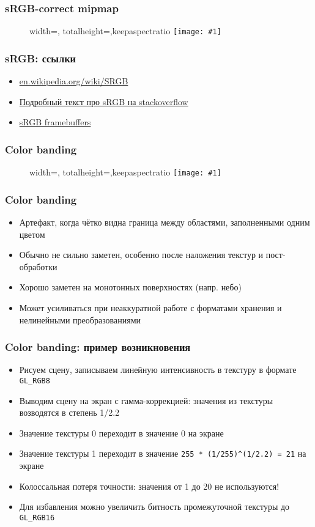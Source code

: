 \documentclass{beamer}
\newcommand{\slideimage}[1]{
  \begin{figure}
    \begin{adjustbox}{width=\textwidth, totalheight=\textheight-2\baselineskip-2\baselineskip,keepaspectratio}
      \texttt{[image: \#1]}
    \end{adjustbox}
  \end{figure}
}
\begin{document}
\begin{frame}[fragile]
\frametitle{sRGB-correct mipmap}
\slideimage{srgb-mipmap.png}
\end{frame}

\begin{frame}[fragile]
\frametitle{sRGB: ссылки}
\begin{itemize}
\item \href{https://en.wikipedia.org/wiki/SRGB}{en.wikipedia.org/wiki/SRGB}
\item \href{https://stackoverflow.com/a/12894053/2315602}{Подробный текст про sRGB на stackoverflow}
\item \href{https://www.khronos.org/opengl/wiki/Framebuffer#Colorspace}{sRGB framebuffers}
\end{itemize}
\end{frame}

\begin{frame}[fragile]
\frametitle{Color banding}
\slideimage{banding.jpg}
\end{frame}

\begin{frame}[fragile]
\frametitle{Color banding}
\begin{itemize}
\item Артефакт, когда чётко видна граница между областями, заполненными одним цветом
\pause
\item Обычно не сильно заметен, особенно после наложения текстур и пост-обработки
\pause
\item Хорошо заметен на монотонных поверхностях (напр. небо)
\pause
\item Может усиливаться при неаккуратной работе с форматами хранения и нелинейными преобразованиями
\end{itemize}
\end{frame}

\begin{frame}[fragile]
\frametitle{Color banding: пример возникновения}
\begin{itemize}
\item Рисуем сцену, записываем линейную интенсивность в текстуру в формате \verb|GL_RGB8|
\pause
\item Выводим сцену на экран с гамма-коррекцией: значения из текстуры возводятся в степень 1/2.2
\pause
\item Значение текстуры 0 переходит в значение 0 на экране
\pause
\item Значение текстуры 1 переходит в значение \verb|255 * (1/255)^(1/2.2) = 21| на экране
\pause
\item Колоссальная потеря точности: значения от 1 до 20 не используются!
\pause
\item Для избавления можно увеличить битность промежуточной текстуры до \verb|GL_RGB16|
\end{itemize}
\end{frame}
\end{document}
